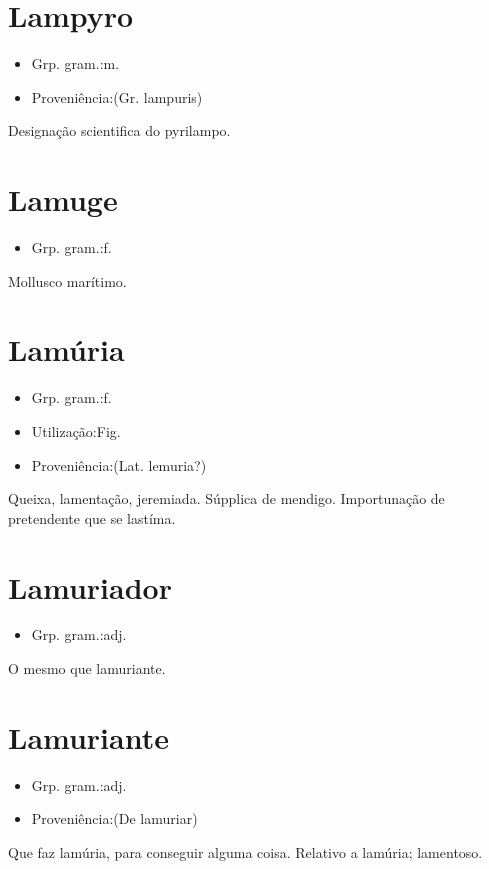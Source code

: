 \section{Lampyro}
\begin{itemize}
\item {Grp. gram.:m.}
\end{itemize}
\begin{itemize}
\item {Proveniência:(Gr. \textunderscore lampuris\textunderscore )}
\end{itemize}
Designação scientifica do pyrilampo.
\section{Lamuge}
\begin{itemize}
\item {Grp. gram.:f.}
\end{itemize}
Mollusco marítimo.
\section{Lamúria}
\begin{itemize}
\item {Grp. gram.:f.}
\end{itemize}
\begin{itemize}
\item {Utilização:Fig.}
\end{itemize}
\begin{itemize}
\item {Proveniência:(Lat. \textunderscore lemuria\textunderscore ?)}
\end{itemize}
Queixa, lamentação, jeremiada.
Súpplica de mendigo.
Importunação de pretendente que se lastíma.
\section{Lamuriador}
\begin{itemize}
\item {Grp. gram.:adj.}
\end{itemize}
O mesmo que \textunderscore lamuriante\textunderscore .
\section{Lamuriante}
\begin{itemize}
\item {Grp. gram.:adj.}
\end{itemize}
\begin{itemize}
\item {Proveniência:(De \textunderscore lamuriar\textunderscore )}
\end{itemize}
Que faz lamúria, para conseguir alguma coisa.
Relativo a lamúria; lamentoso.
